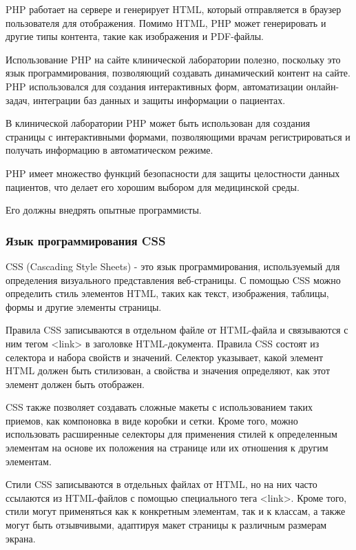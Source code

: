 PHP работает на сервере и генерирует HTML, который отправляется в браузер пользователя для отображения. Помимо HTML, PHP может генерировать и другие типы контента, такие как изображения и PDF-файлы\cite{PHP}.

Использование PHP на сайте клинической лаборатории полезно, поскольку это язык программирования, позволяющий создавать динамический контент на сайте. PHP использовался для создания интерактивных форм, автоматизации онлайн-задач, интеграции баз данных и защиты информации о пациентах.

В клинической лаборатории PHP может быть использован для создания страницы с интерактивными формами, позволяющими врачам регистрироваться и получать информацию в автоматическом режиме.

PHP имеет множество функций безопасности для защиты целостности данных пациентов, что делает его хорошим выбором для медицинской среды.

Его должны внедрять опытные программисты.

\subsubsection{Язык программирования CSS}

CSS (Cascading Style Sheets) - это язык программирования, используемый для определения визуального представления веб-страницы. С помощью CSS можно определить стиль элементов HTML, таких как текст, изображения, таблицы, формы и другие элементы страницы.

Правила CSS записываются в отдельном файле от HTML-файла и связываются с ним тегом <link> в заголовке HTML-документа. Правила CSS состоят из селектора и набора свойств и значений. Селектор указывает, какой элемент HTML должен быть стилизован, а свойства и значения определяют, как этот элемент должен быть отображен\cite{CSS}.

CSS также позволяет создавать сложные макеты с использованием таких приемов, как компоновка в виде коробки и сетки. Кроме того, можно использовать расширенные селекторы для применения стилей к определенным элементам на основе их положения на странице или их отношения к другим элементам.

Стили CSS записываются в отдельных файлах от HTML, но на них часто ссылаются из HTML-файлов с помощью специального тега <link>. Кроме того, стили могут применяться как к конкретным элементам, так и к классам, а также могут быть отзывчивыми, адаптируя макет страницы к различным размерам экрана\cite{css}.

